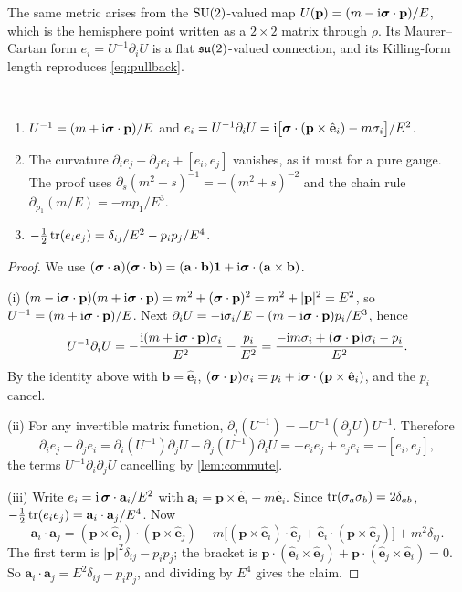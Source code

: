 The same metric arises from the $\mathrm{SU}(2)$-valued map $U(\mathbf p)=(m-\mathrm{i}\boldsymbol{\sigma}\cdot\mathbf p)/E$, which is the hemisphere point written as a $2\times2$ matrix through $\rho$. Its Maurer--Cartan form $e_i=U^{-1}\partial_iU$ is a flat $\mathfrak{su}(2)$-valued connection, and its Killing-form length reproduces \eqref{eq:pullback}.

\begin{proposition}\label{prop:mc}\ver\
\begin{enumerate}[label=(\roman*)]
\item $U^{-1}=(m+\mathrm{i}\boldsymbol{\sigma}\cdot\mathbf p)/E$ and $e_i=U^{-1}\partial_iU=\mathrm{i}\bigl[\boldsymbol{\sigma}\cdot(\mathbf p\times\hat{\mathbf e}_i)-m\sigma_i\bigr]/E^2$.
\item The curvature $\partial_ie_j-\partial_je_i+[e_i,e_j]$ vanishes, as it must for a pure gauge. The proof uses $\partial_s(m^2+s)^{-1}=-(m^2+s)^{-2}$ and the chain rule $\partial_{p_1}(m/E)=-mp_1/E^3$.
\item $-\frac12\operatorname{tr}(e_ie_j)=\delta_{ij}/E^2-p_ip_j/E^4$.
\end{enumerate}
\end{proposition}
\begin{proof}
We use $(\boldsymbol{\sigma}\cdot\mathbf a)(\boldsymbol{\sigma}\cdot\mathbf b)=(\mathbf a\cdot\mathbf b)\mathbf 1+\mathrm{i}\boldsymbol{\sigma}\cdot(\mathbf a\times\mathbf b)$.

(i) $(m-\mathrm{i}\boldsymbol{\sigma}\cdot\mathbf p)(m+\mathrm{i}\boldsymbol{\sigma}\cdot\mathbf p)=m^2+(\boldsymbol{\sigma}\cdot\mathbf p)^2=m^2+|\mathbf p|^2=E^2$, so $U^{-1}=(m+\mathrm{i}\boldsymbol{\sigma}\cdot\mathbf p)/E$. Next $\partial_iU=-\mathrm{i}\sigma_i/E-(m-\mathrm{i}\boldsymbol{\sigma}\cdot\mathbf p)p_i/E^3$, hence
\[
U^{-1}\partial_iU=-\frac{\mathrm{i}(m+\mathrm{i}\boldsymbol{\sigma}\cdot\mathbf p)\sigma_i}{E^2}-\frac{p_i}{E^2}
=\frac{-\mathrm{i} m\sigma_i+(\boldsymbol{\sigma}\cdot\mathbf p)\sigma_i-p_i}{E^2}.
\]
By the identity above with $\mathbf b=\hat{\mathbf e}_i$, $(\boldsymbol{\sigma}\cdot\mathbf p)\sigma_i=p_i+\mathrm{i}\boldsymbol{\sigma}\cdot(\mathbf p\times\hat{\mathbf e}_i)$, and the $p_i$ cancel.

(ii) For any invertible matrix function, $\partial_j(U^{-1})=-U^{-1}(\partial_jU)U^{-1}$. Therefore
\[
\partial_ie_j-\partial_je_i=\partial_i(U^{-1})\partial_jU-\partial_j(U^{-1})\partial_iU=-e_ie_j+e_je_i=-[e_i,e_j],
\]
the terms $U^{-1}\partial_i\partial_jU$ cancelling by \cref{lem:commute}.

(iii) Write $e_i=\mathrm{i}\,\boldsymbol{\sigma}\cdot\mathbf a_i/E^2$ with $\mathbf a_i=\mathbf p\times\hat{\mathbf e}_i-m\hat{\mathbf e}_i$. Since $\operatorname{tr}(\sigma_a\sigma_b)=2\delta_{ab}$, $-\frac12\operatorname{tr}(e_ie_j)=\mathbf a_i\cdot\mathbf a_j/E^4$. Now
\[
\mathbf a_i\cdot\mathbf a_j=(\mathbf p\times\hat{\mathbf e}_i)\cdot(\mathbf p\times\hat{\mathbf e}_j)-m\bigl[(\mathbf p\times\hat{\mathbf e}_i)\cdot\hat{\mathbf e}_j+\hat{\mathbf e}_i\cdot(\mathbf p\times\hat{\mathbf e}_j)\bigr]+m^2\delta_{ij}.
\]
The first term is $|\mathbf p|^2\delta_{ij}-p_ip_j$; the bracket is $\mathbf p\cdot(\hat{\mathbf e}_i\times\hat{\mathbf e}_j)+\mathbf p\cdot(\hat{\mathbf e}_j\times\hat{\mathbf e}_i)=0$. So $\mathbf a_i\cdot\mathbf a_j=E^2\delta_{ij}-p_ip_j$, and dividing by $E^4$ gives the claim.
\end{proof}


